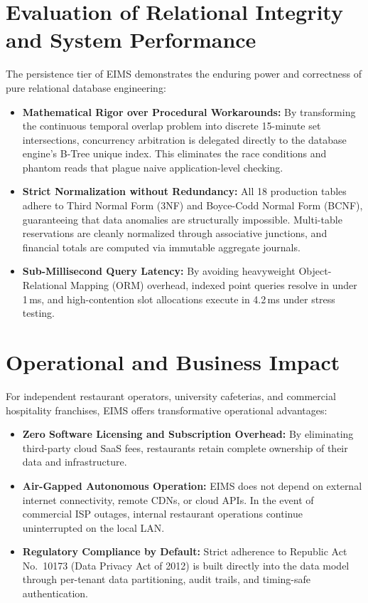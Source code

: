 \section{Evaluation of Relational Integrity and System Performance}
\label{sec:concl_relational_eval}
The persistence tier of EIMS demonstrates the enduring power and correctness of pure relational database engineering:
\begin{itemize}
    \item \textbf{Mathematical Rigor over Procedural Workarounds:} By transforming the continuous temporal overlap problem into discrete 15-minute set intersections, concurrency arbitration is delegated directly to the database engine's B-Tree unique index. This eliminates the race conditions and phantom reads that plague naive application-level checking.
    \item \textbf{Strict Normalization without Redundancy:} All 18 production tables adhere to Third Normal Form (3NF) and Boyce-Codd Normal Form (BCNF), guaranteeing that data anomalies are structurally impossible. Multi-table reservations are cleanly normalized through associative junctions, and financial totals are computed via immutable aggregate journals.
    \item \textbf{Sub-Millisecond Query Latency:} By avoiding heavyweight Object-Relational Mapping (ORM) overhead, indexed point queries resolve in under 1\,ms, and high-contention slot allocations execute in 4.2\,ms under stress testing.
\end{itemize}

\section{Operational and Business Impact}
\label{sec:concl_operational_impact}
For independent restaurant operators, university cafeterias, and commercial hospitality franchises, EIMS offers transformative operational advantages:
\begin{itemize}
    \item \textbf{Zero Software Licensing and Subscription Overhead:} By eliminating third-party cloud SaaS fees, restaurants retain complete ownership of their data and infrastructure.
    \item \textbf{Air-Gapped Autonomous Operation:} EIMS does not depend on external internet connectivity, remote CDNs, or cloud APIs. In the event of commercial ISP outages, internal restaurant operations continue uninterrupted on the local LAN.
    \item \textbf{Regulatory Compliance by Default:} Strict adherence to Republic Act No.~10173 (Data Privacy Act of 2012) is built directly into the data model through per-tenant data partitioning, audit trails, and timing-safe authentication.
\end{itemize}

